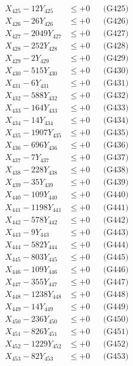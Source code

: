 \documentclass[a4paper,10pt]{article}
\begin{document}
{\begin{align}
X_{425} - 12Y_{425} &\leq +0 && \text{(G425)} \\
X_{426} - 26Y_{426} &\leq +0 && \text{(G426)} \\
X_{427} - 2049Y_{427} &\leq +0 && \text{(G427)} \\
X_{428} - 252Y_{428} &\leq +0 && \text{(G428)} \\
X_{429} - 2Y_{429} &\leq +0 && \text{(G429)} \\
X_{430} - 515Y_{430} &\leq +0 && \text{(G430)} \\
\allowbreak
X_{431} - 6Y_{431} &\leq +0 && \text{(G431)} \\
X_{432} - 588Y_{432} &\leq +0 && \text{(G432)} \\
X_{433} - 164Y_{433} &\leq +0 && \text{(G433)} \\
X_{434} - 14Y_{434} &\leq +0 && \text{(G434)} \\
X_{435} - 1907Y_{435} &\leq +0 && \text{(G435)} \\
X_{436} - 696Y_{436} &\leq +0 && \text{(G436)} \\
X_{437} - 7Y_{437} &\leq +0 && \text{(G437)} \\
X_{438} - 228Y_{438} &\leq +0 && \text{(G438)} \\
X_{439} - 35Y_{439} &\leq +0 && \text{(G439)} \\
X_{440} - 109Y_{440} &\leq +0 && \text{(G440)} \\
\allowbreak
X_{441} - 1198Y_{441} &\leq +0 && \text{(G441)} \\
X_{442} - 578Y_{442} &\leq +0 && \text{(G442)} \\
X_{443} - 9Y_{443} &\leq +0 && \text{(G443)} \\
X_{444} - 582Y_{444} &\leq +0 && \text{(G444)} \\
X_{445} - 803Y_{445} &\leq +0 && \text{(G445)} \\
X_{446} - 109Y_{446} &\leq +0 && \text{(G446)} \\
X_{447} - 355Y_{447} &\leq +0 && \text{(G447)} \\
X_{448} - 1238Y_{448} &\leq +0 && \text{(G448)} \\
X_{449} - 14Y_{449} &\leq +0 && \text{(G449)} \\
X_{450} - 236Y_{450} &\leq +0 && \text{(G450)} \\
\allowbreak
X_{451} - 826Y_{451} &\leq +0 && \text{(G451)} \\
X_{452} - 1229Y_{452} &\leq +0 && \text{(G452)} \\
X_{453} - 82Y_{453} &\leq +0 && \text{(G453)} \\

\end{align}}
\end{document}
